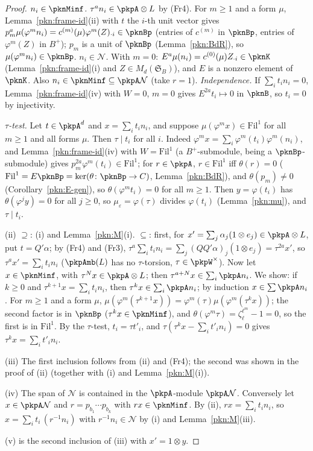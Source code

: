 \documentclass[10pt]{amsart}
\theoremstyle{definition}
\theoremstyle{remark}
\begin{document}
\begin{proof}
\emph{$n_i\in\pknMinf$.} $\tau^an_i\in\pkpA\otimes L$ by (Fr4). For $m\ge1$ and a form $\mu$,
Lemma~\ref{pkn:frame-id}(ii) with $t$ the $i$-th unit vector gives $p_m^a\mu(\varphi^mn_i)=
c^{(m)}(\mu)\varphi^m(Z)_{\cdot i}\in\pknBp$ (entries of $c^{(m)}$ in $\pknBp$, entries of $\varphi^m(Z)$ in
$B^+$); $p_m$ is a unit of $\pknBp$ (Lemma~\ref{pkn:BdR}), so $\mu(\varphi^mn_i)\in\pknBp$.
\emph{$n_i\in\mathcal N$.} With $m=0$: $E^a\mu(n_i)=c^{(0)}(\mu)Z_{\cdot i}\in\pknK$ (Lemma~\ref{pkn:frame-id}(i)
and $Z\in M_d(\mathfrak S_B)$), and $E$ is a nonzero element of $\pknK$. Also $n_i\in\pknMinf\subseteq
\pkpA\mathcal N$ (take $r=1$).
\emph{Independence.} If $\sum_it_in_i=0$, Lemma~\ref{pkn:frame-id}(iv) with $W=0$, $m=0$ gives
$E^{2a}t_i\mapsto0$ in $\pknB$, so $t_i=0$ by injectivity.

\emph{$\tau$-test.} Let $t\in\pkpA^d$ and $x=\sum_it_in_i$, and suppose $\mu(\varphi^{m}x)\in\mathrm{Fil}^1$ for
all $m\ge1$ and all forms $\mu$. Then $\tau\mid t_i$ for all $i$. Indeed $\varphi^mx=\sum_i\varphi^m(t_i)
\varphi^m(n_i)$, and Lemma~\ref{pkn:frame-id}(iv) with $W=\mathrm{Fil}^1$ (a $B^+$-submodule, being a
$\pknBp$-submodule) gives $p_m^{2a}\varphi^m(t_i)\in\mathrm{Fil}^1$; for $r\in\pkpA$, $r\in\mathrm{Fil}^1$ iff
$\theta(r)=0$ ($\mathrm{Fil}^1=E\pknBp=\ker(\theta\colon\pknBp\to C)$, Lemma~\ref{pkn:BdR}), and
$\theta(p_m)\ne0$ (Corollary~\ref{pkn:E-gen}), so $\theta(\varphi^mt_i)=0$ for all $m\ge1$. Then $y=\varphi(t_i)$
has $\theta(\varphi^jy)=0$ for all $j\ge0$, so $\mu_\varepsilon=\varphi(\tau)$ divides $\varphi(t_i)$
(Lemma~\ref{pkn:mu}), and $\tau\mid t_i$.

(ii) $\supseteq$: (i) and Lemma~\ref{pkn:M}(i). $\subseteq$: first, for $x'=\sum_j\alpha_j(1\otimes e_j)\in
\pkpA\otimes L$, put $t=Q'\alpha$; by (Fr4) and (Fr3), $\tau^a\sum_it_in_i=\sum_j(QQ'\alpha)_j(1\otimes e_j)
=\tau^{2a}x'$, so $\tau^ax'=\sum_it_in_i$ ($\pkpAmb(L)$ has no $\tau$-torsion, $\tau\in\pkpW^\times$).
Now let $x\in\pknMinf$, with $\tau^Nx\in\pkpA\otimes L$; then $\tau^{a+N}x\in\sum_i\pkpA n_i$. We show:
if $k\ge0$ and $\tau^{k+1}x=\sum_it_in_i$, then $\tau^kx\in\sum_i\pkpA n_i$; by induction $x\in\sum\pkpA n_i$.
For $m\ge1$ and a form $\mu$, $\mu(\varphi^m(\tau^{k+1}x))=\varphi^m(\tau)\mu(\varphi^m(\tau^kx))$; the second
factor is in $\pknBp$ ($\tau^kx\in\pknMinf$), and $\theta(\varphi^m\tau)=\zeta_\ell^{\ell^m}-1=0$, so the first
is in $\mathrm{Fil}^1$. By the $\tau$-test, $t_i=\tau t'_i$, and $\tau(\tau^kx-\sum_it'_in_i)=0$ gives
$\tau^kx=\sum_it'_in_i$.

(iii) The first inclusion follows from (ii) and (Fr4); the second was shown in the proof of (ii)
(together with (i) and Lemma~\ref{pkn:M}(i)).

(iv) The span of $\mathcal N$ is contained in the $\pkpA$-module $\pkpA\mathcal N$. Conversely let
$x\in\pkpA\mathcal N$ and $r=p_{b_1}\cdots p_{b_k}$ with $rx\in\pknMinf$. By (ii), $rx=\sum_it_in_i$, so
$x=\sum_it_i\,(r^{-1}n_i)$ with $r^{-1}n_i\in\mathcal N$ by (i) and Lemma~\ref{pkn:M}(iii).

(v) is the second inclusion of (iii) with $x'=1\otimes y$.
\end{proof}
\end{document}
